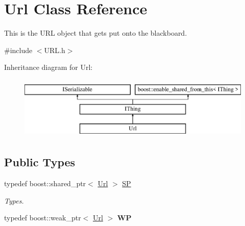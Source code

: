 \hypertarget{class_url}{}\section{Url Class Reference}
\label{class_url}


This is the U\+RL object that gets put onto the blackboard.  




{\ttfamily \#include $<$U\+R\+L.\+h$>$}

Inheritance diagram for Url\+:\begin{figure}[H]
\begin{center}
\leavevmode
\includegraphics[height=3.000000cm]{class_url}
\end{center}
\end{figure}
\subsection*{Public Types}
\begin{DoxyCompactItemize}
\item 
\mbox{\label{class_url_aaca644501980743f3446d0d7a31565be}} 
typedef boost\+::shared\+\_\+ptr$<$ \hyperlink{class_url}{Url} $>$ \hyperlink{class_url_aaca644501980743f3446d0d7a31565be}{SP}
\begin{DoxyCompactList}\small\item\em Types. \end{DoxyCompactList}\item 
\mbox{\label{class_url_af1e4c79eb0de9c11fd1625cc80906575}} 
typedef boost\+::weak\+\_\+ptr$<$ \hyperlink{class_url}{Url} $>$ {\bfseries WP}
\end{DoxyCompactItemize}
